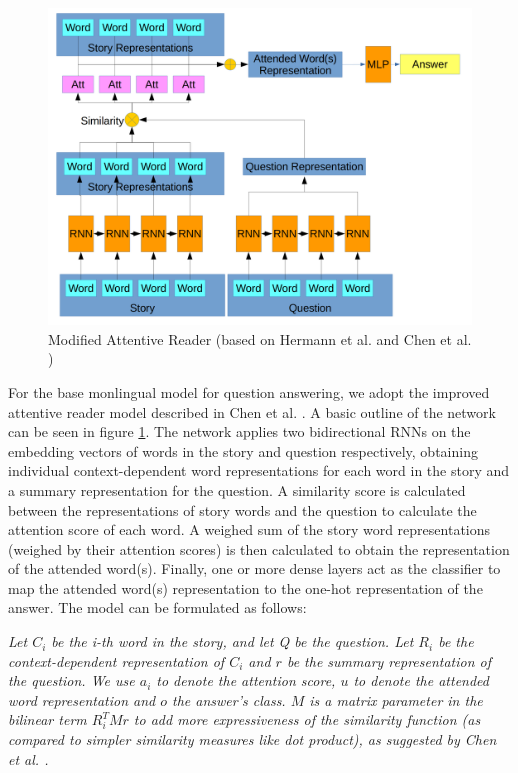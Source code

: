 \documentclass[]{article}
\begin{document}
\begin{center}
	\begin{figure}
		\includegraphics[width=\linewidth]{media/attentive.png}
		\caption{Modified Attentive Reader (based on Hermann et al. \cite{hermann2015teaching} and Chen et al. \cite{chen2016thorough})}
		\label{fig:attentive}
	\end{figure}
\end{center}

For the base monlingual model for question answering, we adopt the improved attentive reader model described in Chen et al. \cite{chen2016thorough}. A basic outline of the network can be seen in figure \ref{fig:attentive}. The network applies two bidirectional RNNs on the embedding vectors of words in the story and question respectively, obtaining individual context-dependent word representations for each word in the story and a summary representation for the question. A similarity score is calculated between the representations of story words and the question to calculate the attention score of each word. A weighed sum of the story word representations (weighed by their attention scores) is then calculated to obtain the representation of the attended word(s). Finally, one or more dense layers act as the classifier to map the attended word(s) representation to the one-hot representation of the answer. The model can be formulated as follows:

\textit{Let $C_i$ be the i-th word in the story, and let Q be the question. Let $R_i$ be the context-dependent representation of $C_i$ and $r$ be the summary representation of the question. We use $a_i$ to denote the attention score, $u$ to denote the attended word representation and $o$ the answer's class. $M$ is a matrix parameter in the bilinear term $R_i^T M r$ to add more expressiveness of the similarity function (as compared to simpler similarity measures like dot product), as suggested by Chen et al. \cite{chen2016thorough}.}
\end{document}
